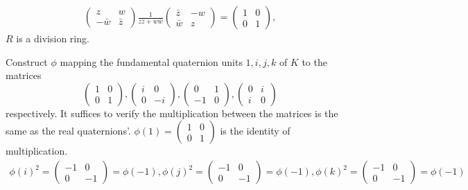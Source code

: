 \begin{enumerate}
\begin{align*}
	\begin{pmatrix}
		z & w \\
		-\bar{w} & \bar{z}
	\end{pmatrix} \frac{1}{z\bar{z}+w\bar{w}}
	\begin{pmatrix}
		\bar{z} & -w \\
		\bar{w} & z
	\end{pmatrix} = 
	\begin{pmatrix}
		1 & 0 \\
		0 & 1
	\end{pmatrix}, 
\end{align*}
$R$ is a division ring.

Construct $\phi$ mapping the fundamental quaternion units $1,i,j,k$ of $K$ to the matrices  
\[\begin{pmatrix}
	1 & 0 \\
	0 & 1
\end{pmatrix},\begin{pmatrix}
	i & 0 \\
	0 & -i
\end{pmatrix},\begin{pmatrix}
	0 & 1 \\
	-1 & 0
\end{pmatrix},\begin{pmatrix}
	0 & i \\
	i & 0
\end{pmatrix}\]
respectively. It suffices to verify the multiplication between the matrices is the same as the real quaternions'. $\phi(1)=\begin{pmatrix}
	1 & 0 \\
	0 & 1
\end{pmatrix}$ is the identity of multiplication. 
\begin{align*}
	\phi(i)^2=\begin{pmatrix}
	-1 & 0 \\
	0 & -1
	\end{pmatrix}=\phi(-1), \phi(j)^2=\begin{pmatrix}
	-1 & 0 \\
	0 & -1
	\end{pmatrix}=\phi(-1), \phi(k)^2=\begin{pmatrix}
	-1 & 0 \\
	0 & -1
	\end{pmatrix}=\phi(-1) \\
\end{align*}
\begin{align*}

\end{align*}
\end{enumerate}
